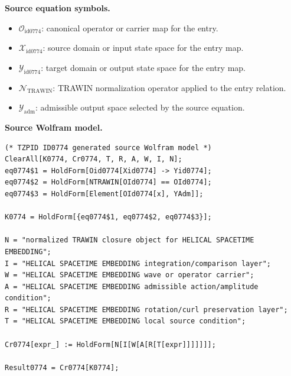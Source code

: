 \begin{minipage}[t]{0.49\linewidth}
\begingroup
\small
\raggedright
\textbf{Source equation symbols.}\par
\begin{itemize}[leftmargin=1.35em,itemsep=1pt,topsep=1pt,parsep=0pt]
    \item $\mathcal{O}_{\mathrm{id0774}}$: canonical operator or carrier map for the entry.
    \item $\mathcal{X}_{\mathrm{id0774}}$: source domain or input state space for the entry map.
    \item $\mathcal{Y}_{\mathrm{id0774}}$: target domain or output state space for the entry map.
    \item $\mathcal{N}_{\mathrm{TRAWIN}}$: TRAWIN normalization operator applied to the entry relation.
    \item $\mathcal{Y}_{\mathrm{adm}}$: admissible output space selected by the source equation.
\end{itemize}
\endgroup
\end{minipage}\hfill
\begin{minipage}[t]{0.47\linewidth}
\begingroup
\scriptsize
\raggedright
\textbf{Source Wolfram model.}\par
\begin{Verbatim}[fontsize=\tiny,breaklines=true,breakanywhere=true]
(* TZPID ID0774 generated source Wolfram model *)
ClearAll[K0774, Cr0774, T, R, A, W, I, N];
eq0774$1 = HoldForm[Oid0774[Xid0774] -> Yid0774];
eq0774$2 = HoldForm[NTRAWIN[OId0774] == OId0774];
eq0774$3 = HoldForm[Element[OId0774[x], YAdm]];

K0774 = HoldForm[{eq0774$1, eq0774$2, eq0774$3}];

N = "normalized TRAWIN closure object for HELICAL SPACETIME EMBEDDING";
I = "HELICAL SPACETIME EMBEDDING integration/comparison layer";
W = "HELICAL SPACETIME EMBEDDING wave or operator carrier";
A = "HELICAL SPACETIME EMBEDDING admissible action/amplitude condition";
R = "HELICAL SPACETIME EMBEDDING rotation/curl preservation layer";
T = "HELICAL SPACETIME EMBEDDING local source condition";

Cr0774[expr_] := HoldForm[N[I[W[A[R[T[expr]]]]]]];

Result0774 = Cr0774[K0774];
\end{Verbatim}
\endgroup
\end{minipage}

